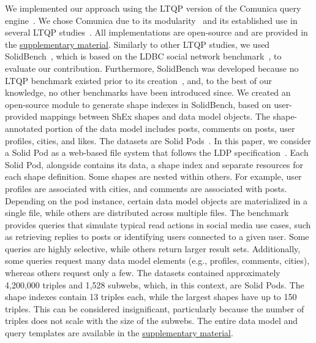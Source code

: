 We implemented our approach using the LTQP version of the Comunica query engine~\cite{taelman_iswc_resources_comunica_2018}.
We chose Comunica due to its modularity~\cite{taelman_swj_componentsjs_2022} and its established use in several LTQP studies~\cite{Bogaerts2021LinkTW, Taelman2023, eschauzier_quweda_linkqueue_2023, Hanski2024, eschauzier_amw_rcubemetric_2024, tam2024opportunitiesshapebasedoptimizationlink}.
All implementations are open-source and are provided in the \hyperref[sec:supplementalMaterial]{supplementary material}.
Similarly to other LTQP studies, we used SolidBench~\cite{Taelman2023}, which is based on the LDBC social network benchmark~\cite{Angles2020}, to evaluate our contribution.
Furthermore, SolidBench was developed because no LTQP benchmark existed prior to its creation~\cite{hartig2018linked, Taelman2023}, and, to the best of our knowledge, no other benchmarks have been introduced since.
We created an open-source module to generate shape indexes in SolidBench, based on user-provided mappings between ShEx shapes and data model objects.
The shape-annotated portion of the data model includes posts, comments on posts, user profiles, cities, and likes.
The datasets are Solid Pods~\cite{sambra_solid_2016, dedecker2022s}.
In this paper, we consider a Solid Pod as a web-based file system that follows the LDP specification~\cite{w3LinkedData}.
Each Solid Pod, alongside contains its data, a shape index and separate resources for each shape definition.
Some shapes are nested within others. 
For example, user profiles are associated with cities, and comments are associated with posts.
Depending on the pod instance, certain data model objects are materialized in a single file, while others are distributed across multiple files.
The benchmark provides queries that simulate typical read actions in social media use cases, such as retrieving replies to posts or identifying users connected to a given user. 
Some queries are highly selective, while others return larger result sets. 
Additionally, some queries request many data model elements (e.g., profiles, comments, cities), whereas others request only a few.
The datasets contained approximately 4,200,000 triples and 1,528 subwebs, which, in this context, are Solid Pods.
The shape indexes contain 13 triples each, while the largest shapes have up to 150 triples. 
This can be considered insignificant, particularly because the number of triples does not scale with the size of the subwebs.
The entire data model and query templates are available in the \hyperref[sec:supplementalMaterial]{supplementary material}.

